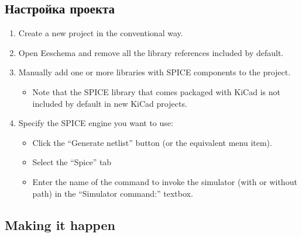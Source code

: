 \subsection{Настройка проекта}

\begin{enumerate}
\item Create a new project in the conventional way.
\item Open Eeschema and remove all the library references included by default.
\item Manually add one or more libraries with SPICE components to the project.
\begin{itemize}
  \item Note that the SPICE library that comes packaged with KiCad is not
  included by default in new KiCad projects.
\end{itemize}
\item Specify the SPICE engine you want to use:
\begin{itemize}
  \item Click the “Generate netlist” button (or the equivalent menu item).
  \item Select the “Spice” tab
  \item Enter the name of the command to invoke the simulator (with or without
path) in the “Simulator command:” textbox.
\end{itemize}
\end{enumerate}

\subsection{Making it happen}

